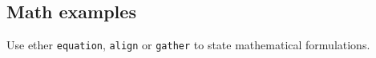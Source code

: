 \documentclass[a4paper,10pt,landscape]{article}
\begin{document}
\begin{multicols*}{3}




\section{Math examples}

Use ether \texttt{equation}, \texttt{align} or \texttt{gather} to 
state mathematical formulations.






\end{multicols*}
\end{document}
